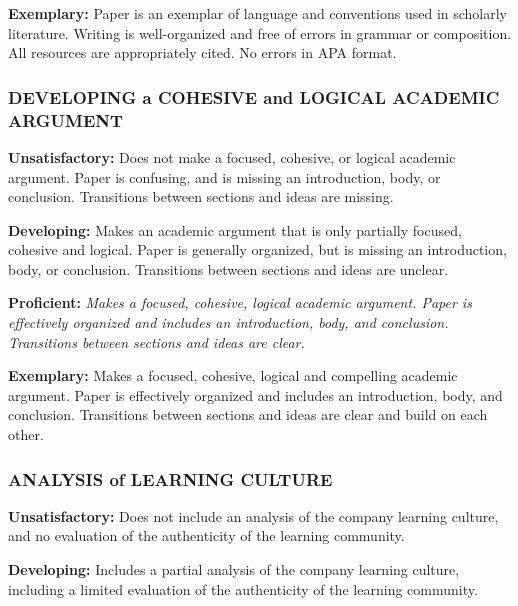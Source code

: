 \documentclass[
]{book}
\begin{document}
\textbf{Exemplary:} Paper is an exemplar of language and conventions used in scholarly literature.
Writing is well-organized and free of errors in grammar or composition. All
resources are appropriately cited. No errors in APA format.

\hypertarget{developing-a-cohesive-and-logical-academic-argument-1}{%
\subsubsection*{DEVELOPING a COHESIVE and LOGICAL ACADEMIC ARGUMENT}\label{developing-a-cohesive-and-logical-academic-argument-1}}

\textbf{Unsatisfactory:} Does not make a focused, cohesive, or logical academic argument. Paper is
confusing, and is missing an introduction, body, or conclusion. Transitions
between sections and ideas are missing.

\textbf{Developing:} Makes an academic argument that is only partially focused, cohesive and logical.
Paper is generally organized, but is missing an introduction, body, or
conclusion. Transitions between sections and ideas are unclear.

\textbf{Proficient:} \emph{Makes a focused, cohesive, logical academic argument. Paper is effectively
organized and includes an introduction, body, and conclusion. Transitions
between sections and ideas are clear.}

\textbf{Exemplary:} Makes a focused, cohesive, logical and compelling academic argument. Paper is
effectively organized and includes an introduction, body, and conclusion.
Transitions between sections and ideas are clear and build on each other.

\hypertarget{analysis-of-learning-culture}{%
\subsubsection*{ANALYSIS of LEARNING CULTURE}\label{analysis-of-learning-culture}}

\textbf{Unsatisfactory:} Does not include an analysis of the company learning culture, and no evaluation
of the authenticity of the learning community.

\textbf{Developing:} Includes a partial analysis of the company learning culture, including a limited
evaluation of the authenticity of the learning community.
\end{document}
